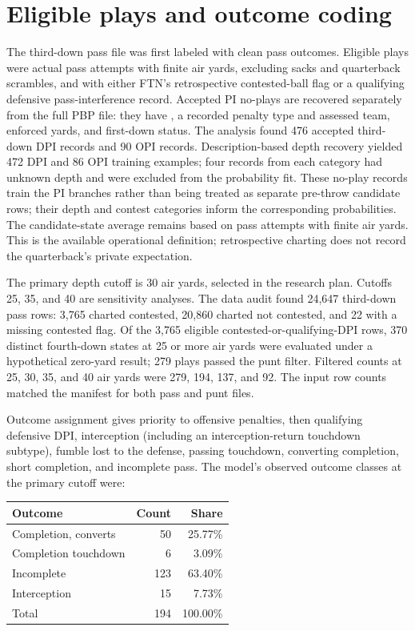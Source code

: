 \documentclass[11pt]{article}
\newcommand{\code}[1]{\texttt{\detokenize{#1}}}
\begin{document}
\section{Eligible plays and outcome coding}

The third-down pass file was first labeled with clean pass outcomes. Eligible plays were actual pass attempts with finite air yards, excluding sacks and quarterback scrambles, and with either FTN's retrospective contested-ball flag or a qualifying defensive pass-interference record. Accepted PI no-plays are recovered separately from the full PBP file: they have \code{play\_type=no\_play}, a recorded penalty type and assessed team, enforced yards, and first-down status. The analysis found 476 accepted third-down DPI records and 90 OPI records. Description-based depth recovery yielded 472 DPI and 86 OPI training examples; four records from each category had unknown depth and were excluded from the probability fit. These no-play records train the PI branches rather than being treated as separate pre-throw candidate rows; their depth and contest categories inform the corresponding probabilities. The candidate-state average remains based on pass attempts with finite air yards. This is the available operational definition; retrospective charting does not record the quarterback's private expectation.

The primary depth cutoff is 30 air yards, selected in the research plan. Cutoffs 25, 35, and 40 are sensitivity analyses. The data audit found 24,647 third-down pass rows: 3,765 charted contested, 20,860 charted not contested, and 22 with a missing contested flag. Of the 3,765 eligible contested-or-qualifying-DPI rows, 370 distinct fourth-down states at 25 or more air yards were evaluated under a hypothetical zero-yard result; 279 plays passed the punt filter. Filtered counts at 25, 30, 35, and 40 air yards were 279, 194, 137, and 92. The input row counts matched the manifest for both pass and punt files.

Outcome assignment gives priority to offensive penalties, then qualifying defensive DPI, interception (including an interception-return touchdown subtype), fumble lost to the defense, passing touchdown, converting completion, short completion, and incomplete pass. The model's observed outcome classes at the primary cutoff were:

\begin{center}
\begin{tabular}{lrr}
\toprule
Outcome & Count & Share \\
\midrule
Completion, converts & 50 & 25.77\% \\
Completion touchdown & 6 & 3.09\% \\
Incomplete & 123 & 63.40\% \\
Interception & 15 & 7.73\% \\
\midrule
Total & 194 & 100.00\% \\
\bottomrule
\end{tabular}
\end{center}
\end{document}
